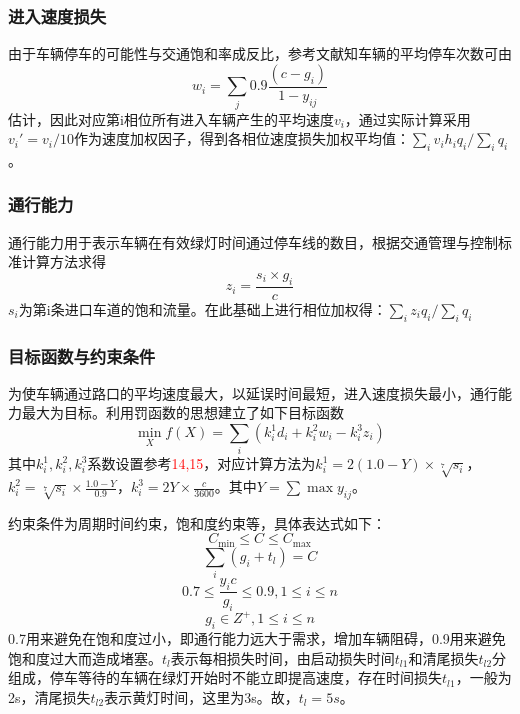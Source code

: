 \subsubsection{进入速度损失}
由于车辆停车的可能性与交通饱和率成反比，参考文献知车辆的平均停车次数可由              \begin{equation}
                                                      w_{i}=\sum_{j} 0.9 \frac{\left(c-g_{i}\right)}{1-y_{i j}}
\end{equation}
估计，因此对应第i相位所有进入车辆产生的平均速度$v_i$，通过实际计算采用$v_i'=v_i/10$作为速度加权因子，得到各相位速度损失加权平均值：$\sum_{i}v_i h_i q_{i} /\sum_{i} q_{i}$。

\subsubsection{通行能力}
通行能力用于表示车辆在有效绿灯时间通过停车线的数目，根据交通管理与控制标准计算方法求得
\begin{equation}
    z_{i}=\frac{s_{i} \times g_{i}}{c}
\end{equation}
$s_i$为第i条进口车道的饱和流量。在此基础上进行相位加权得：$\sum_{i} z_i q_{i} /\sum_{i} q_{i}$

\subsubsection{目标函数与约束条件}
为使车辆通过路口的平均速度最大，以延误时间最短，进入速度损失最小，通行能力最大为目标。利用罚函数的思想建立了如下目标函数
\begin{equation}
    \min _{X} f(X)=\sum_{i}( k_{i}^{1} d_{i}+k_{i}^{2} w_{i}-k_{i}^{3} z_{i})
\end{equation}
其中$k_{i}^{1}, k_{i}^{2}, k_{i}^{3}$系数设置参考\textcolor{red}{14,15}，对应计算方法为$k_{i}^{1}=2(1.0-Y) \times \sqrt[7]{s_{i}}$，$ k_{i}^{2}=\sqrt[7]{s_{i}} \times \frac{1.0-Y}{0.9}$，$k_{i}^{3}=2 Y \times \frac{c}{3600}$。其中$Y=\sum \operatorname{max}y_{ij}$。

约束条件为周期时间约束，饱和度约束等，具体表达式如下：
$$C_{\min } \leqslant C \leqslant C_{\max }$$
$$\sum_{i} (g_{i}+t_{l})=C$$
$$0.7 \leqslant \frac{y_{i} c}{g_{i}} \leqslant 0.9,1 \leqslant i \leqslant n$$
$$g_{i} \in Z^{+}, 1 \leqslant i \leqslant n$$
0.7用来避免在饱和度过小，即通行能力远大于需求，增加车辆阻碍，0.9用来避免饱和度过大而造成堵塞。$t_l$表示每相损失时间，由启动损失时间$t_{l1}$和清尾损失$t_{l2}$分组成，停车等待的车辆在绿灯开始时不能立即提高速度，存在时间损失$t_{l1}$，一般为2s，清尾损失$t_{l2}$表示黄灯时间，这里为3s。故，$t_l=5s$。

